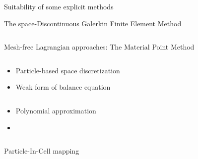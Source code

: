 \begin{withoutheadline}
\begin{frame}{Suitability of some explicit methods}
\begin{block}{The space-Discontinuous Galerkin Finite Element Method \cite{Cockburn}}
\begin{overprint}
\begin{columns}
\begin{column}{0.48\textwidth}
          \end{column}
        \end{columns}
        \vspace{-0.2cm}
      \end{overprint}
    \end{block}
  \end{frame}
\end{withoutheadline}



\begin{withoutheadline}
  \begin{frame}{Mesh-free Lagrangian approaches: The Material Point Method \cite{Sulsky94}}
    \nocite{Sulsky94}
    \begin{columns}
      \begin{footnotesize}
        \begin{column}{0.4\textwidth}
          \begin{itemize}
          \item[] Particle-based space discretization
          \item[] Weak form of balance equation
          \end{itemize}
        \end{column}
        \begin{column}{0.6\textwidth}
          \begin{itemize}
          \item[] Polynomial approximation
          \item[] %
          \end{itemize}
        \end{column}
      \end{footnotesize}
    \end{columns}
    \vspace{-0.2cm}
    \begin{columns}
      \begin{column}{0.48\textwidth}
        \begin{block}{\footnotesize Particle-In-Cell mapping \cite{PIC}}
            

\end{block}
\end{column}
\end{columns}
\end{frame}
\end{withoutheadline}
